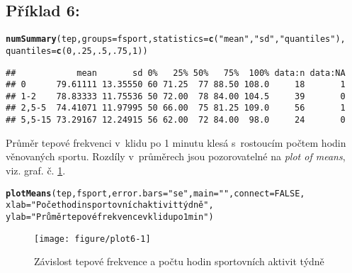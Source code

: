 \documentclass[twoside]{article}\usepackage[]{graphicx}\usepackage[]{color}
\makeatletter
\def\maxwidth{ %
  \ifdim\Gin@nat@width>\linewidth
    \linewidth
  \else
    \Gin@nat@width
  \fi
}
\newcommand{\hlnum}[1]{\textcolor[rgb]{0.686,0.059,0.569}{#1}}%
\newcommand{\hlstr}[1]{\textcolor[rgb]{0.192,0.494,0.8}{#1}}%
\newcommand{\hlstd}[1]{\textcolor[rgb]{0.345,0.345,0.345}{#1}}%
\newcommand{\hlkwc}[1]{\textcolor[rgb]{0.333,0.667,0.333}{#1}}%
\newcommand{\hlkwd}[1]{\textcolor[rgb]{0.737,0.353,0.396}{\textbf{#1}}}%
\newenvironment{kframe}{%
 \def\at@end@of@kframe{}%
 \ifinner\ifhmode%
  \def\at@end@of@kframe{\end{minipage}}%
  \begin{minipage}{\columnwidth}%
 \fi\fi%
 \def\FrameCommand##1{\hskip\@totalleftmargin \hskip-\fboxsep
 \colorbox{shadecolor}{##1}\hskip-\fboxsep
     \hskip-\linewidth \hskip-\@totalleftmargin \hskip\columnwidth}%
 \MakeFramed {\advance\hsize-\width
   \@totalleftmargin\z@ \linewidth\hsize
   \@setminipage}}%
 {\par\unskip\endMakeFramed%
 \at@end@of@kframe}
\newenvironment{knitrout}{}{} %
\makeatother
\begin{document}
\subsection*{Příklad 6:}
\begin{knitrout}
\color{fgcolor}\begin{kframe}
\begin{alltt}
\hlkwd{numSummary}\hlstd{(tep,} \hlkwc{groups}\hlstd{=fsport,} \hlkwc{statistics}\hlstd{=}\hlkwd{c}\hlstd{(}\hlstr{"mean"}\hlstd{,} \hlstr{"sd"}\hlstd{,} \hlstr{"quantiles"}\hlstd{),}
    \hlkwc{quantiles}\hlstd{=}\hlkwd{c}\hlstd{(}\hlnum{0}\hlstd{,}\hlnum{.25}\hlstd{,}\hlnum{.5}\hlstd{,}\hlnum{.75}\hlstd{,}\hlnum{1}\hlstd{))}
\end{alltt}
\begin{verbatim}
##            mean       sd 0%   25% 50%   75%  100% data:n data:NA
## 0      79.61111 13.35550 60 71.25  77 88.50 108.0     18       1
## 1-2    78.83333 11.75536 50 72.00  78 84.00 104.5     39       0
## 2,5-5  74.41071 11.97995 50 66.00  75 81.25 109.0     56       1
## 5,5-15 73.29167 12.24915 56 62.00  72 84.00  98.0     24       0
\end{verbatim}
\end{kframe}
\end{knitrout}

Průměr tepové frekvenci v~klidu po 1 minutu klesá s~rostoucím počtem hodin věnovaných sportu. Rozdíly v~průměrech jsou pozorovatelné na \emph{plot of means}, viz. graf. č. \ref{fig:plot6}.

\begin{knitrout}
\color{fgcolor}\begin{kframe}
\begin{alltt}
\hlkwd{plotMeans}\hlstd{(tep, fsport,} \hlkwc{error.bars}\hlstd{=}\hlstr{"se"}\hlstd{,} \hlkwc{main}\hlstd{=}\hlstr{""}\hlstd{,} \hlkwc{connect}\hlstd{=}\hlnum{FALSE}\hlstd{,}
    \hlkwc{xlab}\hlstd{=}\hlstr{"Počet hodin sportovních aktivit týdně"}\hlstd{,}
    \hlkwc{ylab}\hlstd{=}\hlstr{"Průměr tepové frekvence v klidu po 1 min"}\hlstd{)}
\end{alltt}
\end{kframe}\begin{figure}[h]
\texttt{[image: figure/plot6-1]} \caption[Závislost tepové frekvence a počtu hodin sportovních aktivit týdně]{Závislost tepové frekvence a počtu hodin sportovních aktivit týdně}\label{fig:plot6}
\end{figure}


\end{knitrout}
\end{document}
